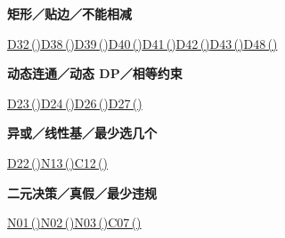 \documentclass[10pt,a4paper]{article}
\newcommand{\grouphead}[1]{\needspace{7\baselineskip}\par\vspace{7pt}{\large\bfseries #1}\par\vspace{5pt}}
\begin{document}
\begin{minipage}{\linewidth}\textbf{矩形／贴边／不能相减}\par{\fontsize{9.5}{12}\selectfont \hyperref[D32]{D32\,(\pageref*{D32})}\hspace{.5em}\allowbreak \hyperref[D38]{D38\,(\pageref*{D38})}\hspace{.5em}\allowbreak \hyperref[D39]{D39\,(\pageref*{D39})}\hspace{.5em}\allowbreak \hyperref[D40]{D40\,(\pageref*{D40})}\hspace{.5em}\allowbreak \hyperref[D41]{D41\,(\pageref*{D41})}\hspace{.5em}\allowbreak \hyperref[D42]{D42\,(\pageref*{D42})}\hspace{.5em}\allowbreak \hyperref[D43]{D43\,(\pageref*{D43})}\hspace{.5em}\allowbreak \hyperref[D48]{D48\,(\pageref*{D48})}}\end{minipage}\par\vspace{5pt}
\begin{minipage}{\linewidth}\textbf{动态连通／动态 DP／相等约束}\par{\fontsize{9.5}{12}\selectfont \hyperref[D23]{D23\,(\pageref*{D23})}\hspace{.5em}\allowbreak \hyperref[D24]{D24\,(\pageref*{D24})}\hspace{.5em}\allowbreak \hyperref[D26]{D26\,(\pageref*{D26})}\hspace{.5em}\allowbreak \hyperref[D27]{D27\,(\pageref*{D27})}}\end{minipage}\par\vspace{5pt}
\begin{minipage}{\linewidth}\textbf{异或／线性基／最少选几个}\par{\fontsize{9.5}{12}\selectfont \hyperref[D22]{D22\,(\pageref*{D22})}\hspace{.5em}\allowbreak \hyperref[N13]{N13\,(\pageref*{N13})}\hspace{.5em}\allowbreak \hyperref[C12]{C12\,(\pageref*{C12})}}\end{minipage}\par\vspace{5pt}
\grouphead{选点、匹配与一般难题}
\begin{minipage}{\linewidth}\textbf{二元决策／真假／最少违规}\par{\fontsize{9.5}{12}\selectfont \hyperref[N01]{N01\,(\pageref*{N01})}\hspace{.5em}\allowbreak \hyperref[N02]{N02\,(\pageref*{N02})}\hspace{.5em}\allowbreak \hyperref[N03]{N03\,(\pageref*{N03})}\hspace{.5em}\allowbreak \hyperref[C07]{C07\,(\pageref*{C07})}}\end{minipage}\par\vspace{5pt}
\end{document}
